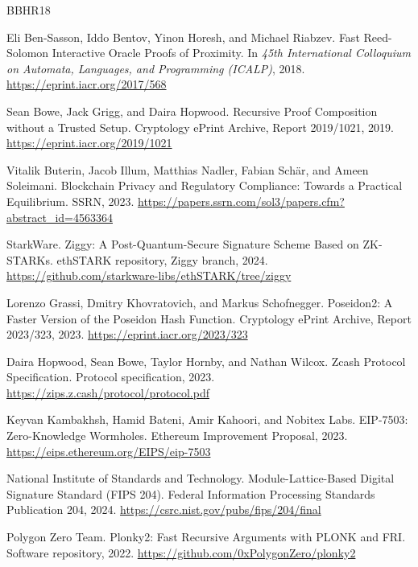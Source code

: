 \documentclass{iacrcc}
\begin{document}
\begin{thebibliography}{BBHR18}

Eli Ben-Sasson, Iddo Bentov, Yinon Horesh, and Michael Riabzev.
\newblock Fast Reed-Solomon Interactive Oracle Proofs of Proximity.
\newblock In \emph{45th International Colloquium on Automata, Languages, and Programming (ICALP)}, 2018.
\newblock \url{https://eprint.iacr.org/2017/568}

Sean Bowe, Jack Grigg, and Daira Hopwood.
\newblock Recursive Proof Composition without a Trusted Setup.
\newblock Cryptology ePrint Archive, Report 2019/1021, 2019.
\newblock \url{https://eprint.iacr.org/2019/1021}

Vitalik Buterin, Jacob Illum, Matthias Nadler, Fabian Sch\"{a}r, and Ameen Soleimani.
\newblock Blockchain Privacy and Regulatory Compliance: Towards a Practical Equilibrium.
\newblock SSRN, 2023.
\newblock \url{https://papers.ssrn.com/sol3/papers.cfm?abstract_id=4563364}

StarkWare.
\newblock Ziggy: A Post-Quantum-Secure Signature Scheme Based on ZK-STARKs.
\newblock ethSTARK repository, Ziggy branch, 2024.
\newblock \url{https://github.com/starkware-libs/ethSTARK/tree/ziggy}

Lorenzo Grassi, Dmitry Khovratovich, and Markus Schofnegger.
\newblock Poseidon2: A Faster Version of the Poseidon Hash Function.
\newblock Cryptology ePrint Archive, Report 2023/323, 2023.
\newblock \url{https://eprint.iacr.org/2023/323}

Daira Hopwood, Sean Bowe, Taylor Hornby, and Nathan Wilcox.
\newblock Zcash Protocol Specification.
\newblock Protocol specification, 2023.
\newblock \url{https://zips.z.cash/protocol/protocol.pdf}

Keyvan Kambakhsh, Hamid Bateni, Amir Kahoori, and Nobitex Labs.
\newblock EIP-7503: Zero-Knowledge Wormholes.
\newblock Ethereum Improvement Proposal, 2023.
\newblock \url{https://eips.ethereum.org/EIPS/eip-7503}

National Institute of Standards and Technology.
\newblock Module-Lattice-Based Digital Signature Standard (FIPS 204).
\newblock Federal Information Processing Standards Publication 204, 2024.
\newblock \url{https://csrc.nist.gov/pubs/fips/204/final}

Polygon Zero Team.
\newblock Plonky2: Fast Recursive Arguments with PLONK and FRI.
\newblock Software repository, 2022.
\newblock \url{https://github.com/0xPolygonZero/plonky2}


\end{thebibliography}
\end{document}
